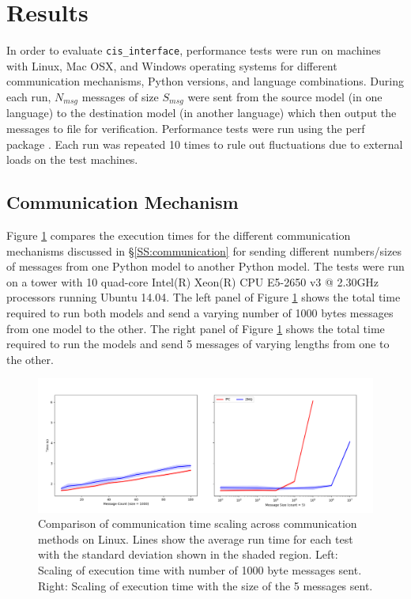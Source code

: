 \documentclass[journal]{IEEEtran}
\newcommand{\todo}[1]{{\color{red}{#1}}}
\newcommand{\cis}{{\tt cis\_interface}{}}
\begin{document}
\section{Results}\label{S:results}
%
In order to evaluate {\cis}, performance tests were run on machines with Linux, Mac OSX, and Windows operating systems for different communication mechanisms, Python versions, and language combinations. During each run, $N_{msg}$ messages of size $S_{msg}$ were sent from the source model (in one language) to the destination model (in another language) which then output the messages to file for verification. Performance tests were run using the perf package \citep{Stinner2018}. Each run was repeated 10 times to rule out fluctuations due to external loads on the test machines.

\subsection{Communication Mechanism}\label{SS:results_commtype}
%
Figure \ref{fig:commtype} compares the execution times for the different communication mechanisms discussed in \S\ref{SS:communication} for sending different numbers/sizes of messages from one Python model to another Python model. The tests were run on a \todo{Dell?} tower with 10 quad-core Intel(R) Xeon(R) CPU E5-2650 v3 @ 2.30GHz processors running Ubuntu 14.04. The left panel of Figure \ref{fig:commtype} shows the total time required to run both models and send a varying number of 1000 bytes messages from one model to the other. The right panel of Figure \ref{fig:commtype} shows the total time required to run the models and send 5 messages of varying lengths from one to the other. 
%
\ifinclfig
 	\begin{figure}[htbp]
	\begin{center}
	\includegraphics[width=\columnwidth,keepaspectratio]{./images/scaling_commtype.png}
	\caption{Comparison of communication time scaling across communication methods on Linux. Lines show the average run time for each test with the standard deviation shown in the shaded region. Left: Scaling of execution time with number of 1000 byte messages sent. Right: Scaling of execution time with the size of the 5 messages sent.}
	\label{fig:commtype}
	\end{center}
	\end{figure}
\fi
%
\end{document}
